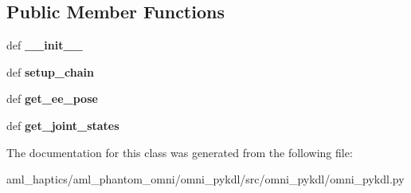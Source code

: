 \subsection*{Public Member Functions}
\begin{DoxyCompactItemize}
\item 
\hypertarget{classomni__pykdl_1_1omni__pykdl_1_1_omni_py_k_d_l_aae7c1cbf8bb2d6ff181c5a191e6195c8}{def {\bfseries \-\_\-\-\_\-init\-\_\-\-\_\-}}\label{classomni__pykdl_1_1omni__pykdl_1_1_omni_py_k_d_l_aae7c1cbf8bb2d6ff181c5a191e6195c8}

\item 
\hypertarget{classomni__pykdl_1_1omni__pykdl_1_1_omni_py_k_d_l_ad28c28d8b93bddefc926e21f2fc56824}{def {\bfseries setup\-\_\-chain}}\label{classomni__pykdl_1_1omni__pykdl_1_1_omni_py_k_d_l_ad28c28d8b93bddefc926e21f2fc56824}

\item 
\hypertarget{classomni__pykdl_1_1omni__pykdl_1_1_omni_py_k_d_l_a30f0391b2db4bf1e91a101b9c9c084b9}{def {\bfseries get\-\_\-ee\-\_\-pose}}\label{classomni__pykdl_1_1omni__pykdl_1_1_omni_py_k_d_l_a30f0391b2db4bf1e91a101b9c9c084b9}

\item 
\hypertarget{classomni__pykdl_1_1omni__pykdl_1_1_omni_py_k_d_l_a35efa9896efa9a672d088f63125a0c68}{def {\bfseries get\-\_\-joint\-\_\-states}}\label{classomni__pykdl_1_1omni__pykdl_1_1_omni_py_k_d_l_a35efa9896efa9a672d088f63125a0c68}

\end{DoxyCompactItemize}


The documentation for this class was generated from the following file\-:\begin{DoxyCompactItemize}
\item 
aml\-\_\-haptics/aml\-\_\-phantom\-\_\-omni/omni\-\_\-pykdl/src/omni\-\_\-pykdl/omni\-\_\-pykdl.\-py\end{DoxyCompactItemize}
